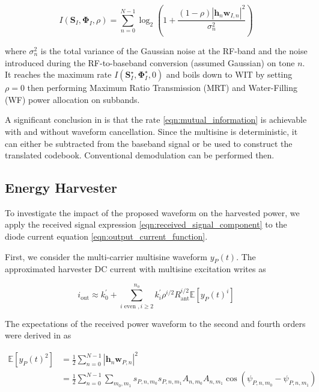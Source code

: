 \begin{equation}\label{eqn:mutual_information}
  I\left( {{{\mathbf{S}}_I},{{\mathbf{\Phi }}_I},\rho } \right) = \sum\limits_{n = 0}^{N - 1} {{{\log }_2}} \left( {1 + \frac{{(1 - \rho ){{\left| {{{\mathbf{h}}_n}{{\mathbf{w}}_{I,n}}} \right|}^2}}}{{\sigma _n^2}}} \right)
\end{equation}

where ${\sigma _n^2}$ is the total variance of the Gaussian noise at the RF-band and the noise introduced during the RF-to-baseband conversion (assumed Gaussian) on tone $n$. It reaches the maximum rate $I\left( {{\mathbf{S}}_I^ \star ,{\mathbf{\Phi }}_I^ \star ,0} \right)$ and boils down to WIT by setting $\rho  = 0$ then performing Maximum Ratio Transmission (MRT) and Water-Filling (WF) power allocation on subbands.

A significant conclusion in \cite{Clerckx2018} is that the rate \eqref{eqn:mutual_information} is achievable with and without waveform cancellation. Since the multisine is deterministic, it can either be subtracted from the baseband signal or be used to construct the translated codebook. Conventional demodulation can be performed then.



\subsection{Energy Harvester}\label{sec:energy-harvester}
To investigate the impact of the proposed waveform on the harvested power, we apply the received signal expression \eqref{eqn:received_signal_component} to the diode current equation \eqref{eqn:output_current_function}.

First, we consider the multi-carrier multisine waveform ${y_P}(t)$. The approximated harvester DC current with multisine excitation writes as

\begin{equation}\label{eqn:current_power}
  {i_{\text{out}}} \approx k_0^\prime  + \sum\limits_{i{\text{ even }},i \geqslant 2}^{{n_o}} {k_i^\prime } {\rho ^{i/2}}R_{\text{ant}}^{i/2}\mathbb{E}\left[ {{y_P}{{(t)}^i}} \right]
\end{equation}

The expectations of the received power waveform to the second and fourth orders were derived in \cite{Clerckx2016} as

\begin{align}\label{eqn:power_waveform_second_order}
  \mathbb{E}\left[ {{y_P}{{(t)}^2}} \right] &= \frac{1}{2}\sum\limits_{n = 0}^{N - 1} {{{\left| {{{\mathbf{h}}_n}{{\mathbf{w}}_{P,n}}} \right|}^2}} \\
   &= \frac{1}{2}\sum\limits_{n = 0}^{N - 1} {\sum\limits_{{m_0},{m_1}} {{s_{P,n,{m_0}}}{s_{P,n,{m_1}}}{A_{n,{m_0}}}{A_{n,{m_1}}}\cos \left( {{\psi _{P,n,{m_0}}} - {\psi _{P,n,{m_1}}}} \right)} }
\end{align}

